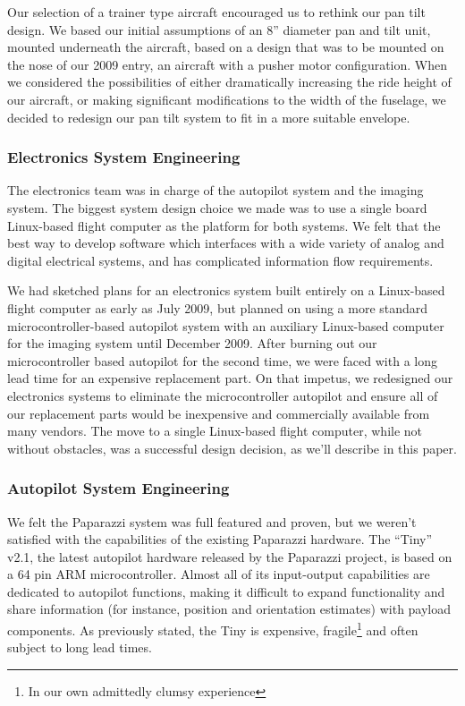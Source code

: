 \documentclass[pdftex,10pt,letter]{article}
\begin{document}
Our selection of a trainer type aircraft encouraged us to rethink our pan tilt design. We based our initial assumptions of an 8'' diameter pan and tilt unit, mounted underneath the aircraft, based on a design that was to be mounted on the nose of our 2009 entry, an aircraft with a pusher motor configuration. When we considered the possibilities of either dramatically increasing the ride height of our aircraft, or making significant modifications to the width of the fuselage, we decided to redesign our pan tilt system to fit in a more suitable envelope. 

\subsubsection{Electronics System Engineering}

The electronics team was in charge of the autopilot system and the imaging system. The biggest system design choice we made was to use a single board Linux-based flight computer as the platform for both systems. We felt that the best way to develop software which interfaces with a wide variety of analog and digital electrical systems, and has complicated information flow requirements.

We had sketched plans for an electronics system built entirely on a Linux-based flight computer as early as July 2009, but planned on using a more standard microcontroller-based autopilot system with an auxiliary Linux-based computer for the imaging system until December 2009. After burning out our microcontroller based autopilot for the second time, we were faced with a long lead time for an expensive replacement part. On that impetus, we redesigned our electronics systems to eliminate the microcontroller autopilot and ensure all of our replacement parts would be inexpensive and commercially available from many vendors. The move to a single Linux-based flight computer, while not without obstacles, was a successful design decision, as we'll describe in this paper.

\subsubsection{Autopilot System Engineering}

We felt the Paparazzi system was full featured and proven, but we weren't satisfied with the capabilities of the existing Paparazzi hardware. The ``Tiny'' v2.1\cite{paparazzi_tinyv21}, the latest autopilot hardware released by the Paparazzi project, is based on a 64 pin ARM microcontroller. Almost all of its input-output capabilities are dedicated to autopilot functions, making it difficult to expand functionality and share information (for instance, position and orientation estimates) with payload components. As previously stated, the Tiny is expensive, fragile\footnote{In our own admittedly clumsy experience} and often subject to long lead times. 
\end{document}
